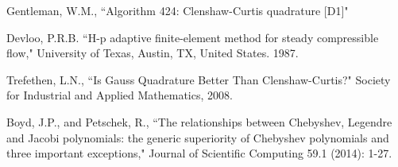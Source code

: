\documentclass[10pt,a4paper]{article}
\begin{document}
\begin{thebibliography}{1}
		
		Gentleman, W.M., ``Algorithm 424: Clenshaw-Curtis quadrature [D1]"
		
		Devloo, P.R.B. ``H-p adaptive finite-element method for steady compressible flow," University of Texas, Austin, TX, United States. 1987.
		
		Trefethen, L.N., ``Is Gauss Quadrature Better Than Clenshaw-Curtis?" Society for Industrial and Applied Mathematics, 2008.
		
		Boyd, J.P., and Petschek, R., ``The relationships between Chebyshev, Legendre and Jacobi polynomials: the generic superiority of Chebyshev polynomials and three important exceptions," Journal of Scientific Computing 59.1 (2014): 1-27.
		
	\end{thebibliography}
\end{document}
